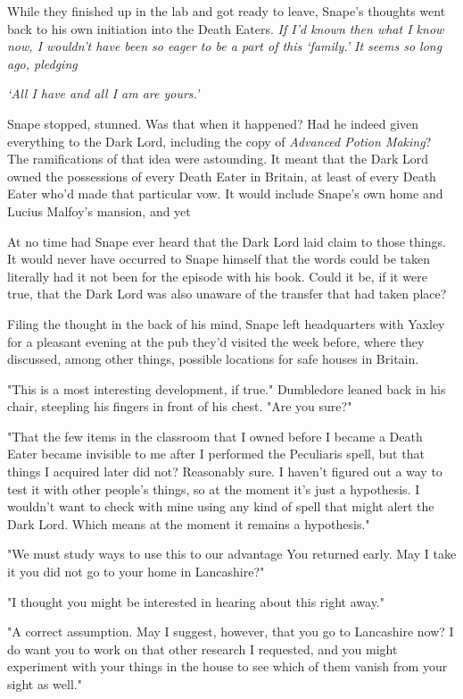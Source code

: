 While they finished up in the lab and got ready to leave, Snape's thoughts went back to his own initiation into the Death Eaters. \emph{If I'd known then what I know now, I wouldn't have been so eager to be a part of this `family.' It seems so long ago, pledging{\el}}

\emph{`All I have and all I am are yours.'}

Snape stopped, stunned. Was that when it happened? Had he indeed given everything to the Dark Lord, including the copy of \emph{Advanced Potion Making}? The ramifications of that idea were astounding. It meant that the Dark Lord owned the possessions of every Death Eater in Britain, at least of every Death Eater who'd made that particular vow. It would include Snape's own home and Lucius Malfoy's mansion, and yet{\el}

At no time had Snape ever heard that the Dark Lord laid claim to those things. It would never have occurred to Snape himself that the words could be taken literally had it not been for the episode with his book. Could it be, if it were true, that the Dark Lord was also unaware of the transfer that had taken place?

Filing the thought in the back of his mind, Snape left headquarters with Yaxley for a pleasant evening at the pub they'd visited the week before, where they discussed, among other things, possible locations for safe houses in Britain.

\sbreak

"This is a most interesting development, if true." Dumbledore leaned back in his chair, steepling his fingers in front of his chest. "Are you sure?"

"That the few items in the classroom that I owned before I became a Death Eater became invisible to me after I performed the Peculiaris spell, but that things I acquired later did not? Reasonably sure. I haven't figured out a way to test it with other people's things, so at the moment it's just a hypothesis. I wouldn't want to check with mine using any kind of spell that might alert the Dark Lord. Which means at the moment it remains a hypothesis."

"We must study ways to use this to our advantage{\el} You returned early. May I take it you did not go to your home in Lancashire?"

"I thought you might be interested in hearing about this right away."

"A correct assumption. May I suggest, however, that you go to Lancashire now? I do want you to work on that other research I requested, and you might experiment with your things in the house to see which of them vanish from your sight as well."

